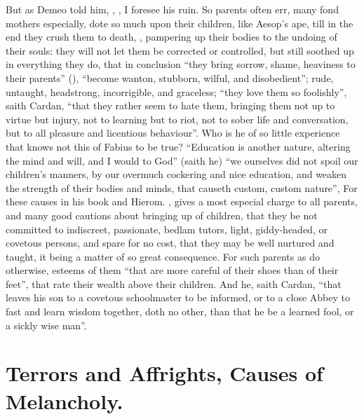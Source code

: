 But as Demeo told him, , , I foresee his ruin. So parents often err, many fond mothers
especially, dote so much upon their children, like Aesop's
ape, till in the end they crush them to death, , pampering up their bodies to the undoing of their souls: they will
not let them be corrected or controlled, but still soothed
up in everything they do, that in conclusion \enquote{they bring sorrow, shame,
heaviness to their parents} (), \enquote{become
wanton, stubborn, wilful, and disobedient}; rude, untaught, headstrong,
incorrigible, and graceless; \enquote{they love them so foolishly}, saith
Cardan, \enquote{that they rather seem to hate them, bringing them
not up to virtue but injury, not to learning but to riot, not to sober life and
conversation, but to all pleasure and licentious behaviour}. Who is he of so
little experience that knows not this of Fabius to be true?
\enquote{Education is another nature, altering the mind and will,
and I would to God} (saith he) \enquote{we ourselves did not spoil our children's
manners, by our overmuch cockering and nice education, and weaken the strength
of their bodies and minds, that causeth custom, custom nature}, \etc{} For
these causes \Plutarch{} in his book  and
Hierom. , gives a most especial charge to all parents, and many good cautions
about bringing up of children, that they be not committed to indiscreet,
passionate, bedlam tutors, light, giddy-headed, or covetous persons, and spare
for no cost, that they may be well nurtured and taught, it being a matter of so
great consequence. For such parents as do otherwise, \Plutarch{} esteems of them
\enquote{that are more careful of their shoes than of their feet},
that rate their wealth above their children. And he, saith
Cardan, \enquote{that leaves his son to a covetous schoolmaster to
be informed, or to a close Abbey to fast and learn wisdom together, doth no
other, than that he be a learned fool, or a sickly wise man}.

\section{Terrors and Affrights, Causes of
Melancholy.}\label{sec:terrors-and-affrights}

